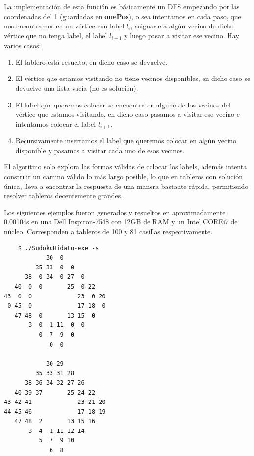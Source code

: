 \documentclass[a4paper, 12pt]{article}
\begin{document}
La implementaci\'on de esta funci\'on es b\'asicamente un DFS empezando por las coordenadas del 1 (guardadas en \textbf{onePos}), o sea intentamos en cada
paso, que nos encontramos en un v\'ertice con label $l_i$, asignarle a alg\'un vecino de dicho v\'ertice que no tenga label, el label $l_{i+1}$ y luego
pasar a visitar ese vecino. Hay varios casos:

\begin{enumerate}
   \item El tablero est\'a resuelto, en dicho caso se devuelve.
   \item El v\'ertice que estamos visitando no tiene vecinos disponibles, en dicho caso se devuelve una lista vac\'ia (no es soluci\'on).
   \item El label que queremos colocar se encuentra en alguno de los vecinos del v\'ertice que estamos visitando, en dicho caso
         pasamos a visitar ese vecino e intentamos colocar el label $l_{i+1}$.
   \item Recursivamente insertamos el label que queremos colocar en alg\'un vecino disponible y pasamos a visitar cada uno de esos vecinos.
\end{enumerate}

El algoritmo solo explora las formas v\'alidas de colocar los labels, adem\'as intenta construir un camino v\'alido lo m\'as largo
posible, lo que en tableros con soluci\'on \'unica, lleva a encontrar la respuesta de una manera bastante r\'apida, permitiendo
resolver tableros decentemente grandes.

Los siguientes ejemplos fueron generados y resueltos en aproximadamente 0.00104s en una Dell Inspiron-7548 con 12GB de RAM y
un Intel COREi7 de n\'ucleo. Corresponden a tableros de 100 y 81 casillas respectivamente.

\begin{verbatim}
    $ ./SudokuHidato-exe -s
            30  0            
         35 33  0  0         
      38  0 34  0 27  0      
   40  0  0       25  0 22   
43  0  0             23  0 20
 0 45  0             17 18  0
   47 48  0       13 15  0   
       3  0  1 11  0  0      
          0  7  9  0         
             0  0            

            30 29            
         35 33 31 28         
      38 36 34 32 27 26      
   40 39 37       25 24 22   
43 42 41             23 21 20
44 45 46             17 18 19
   47 48  2       13 15 16   
       3  4  1 11 12 14      
          5  7  9 10         
             6  8       
\end{verbatim}
\end{document}
